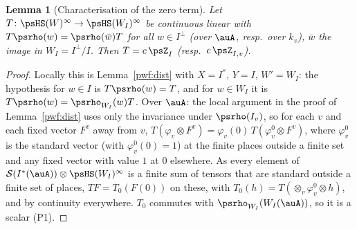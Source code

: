 \documentclass[10pt]{amsart}
\newtheorem{lemma}[theorem]{Lemma}
\theoremstyle{definition}
\theoremstyle{remark}
\providecommand{\auS}{\mathcal S}
\begin{document}
\begin{lemma}[Characterisation of the zero term]\label{pwf:Zunique}
Let $T\colon\psHS(W)^\infty\to\psHS(W_I)^\infty$ be continuous linear with $T\psrho(w)=
\psrho(\bar w)T$ for all $w\in I^\perp$ (over $\auA$, resp.\ over $k_v$), $\bar w$ the image in
$W_I=I^\perp/I$. Then $T=c\,\psZ_I$ (resp.\ $c\,\psZ_{I,v}$).
\end{lemma}
\begin{proof}
Locally this is Lemma~\ref{pwf:dist} with $X=I^*$, $Y=I$, $W'=W_I$: the hypothesis for $w\in I$ is
$T\psrho(w)=T$, and for $w\in W_I$ it is $T\psrho(w)=\psrho_{W_I}(w)T$. Over $\auA$: the local
argument in the proof of Lemma~\ref{pwf:dist} uses only the invariance under $\psrho(I_v)$, so for
each $v$ and each fixed vector $F^v$ away from $v$, $T(\varphi_v\otimes F^v)=\varphi_v(0)\,
T(\varphi_v^0\otimes F^v)$, where $\varphi^0_v$ is the standard vector (with $\varphi^0_v(0)=1$) at
the finite places outside a finite set and any fixed vector with value $1$ at $0$ elsewhere. As every
element of $\auS(I^*(\auA))\otimes\psHS(W_I)^\infty$ is a finite sum of tensors that are standard
outside a finite set of places, $TF=T_0(F(0))$ on these, with $T_0(h)=T(\otimes_v\varphi^0_v\otimes h)$,
and by continuity everywhere. $T_0$ commutes with $\psrho_{W_I}(W_I(\auA))$, so it is a scalar (P1).
\end{proof}
\end{document}
